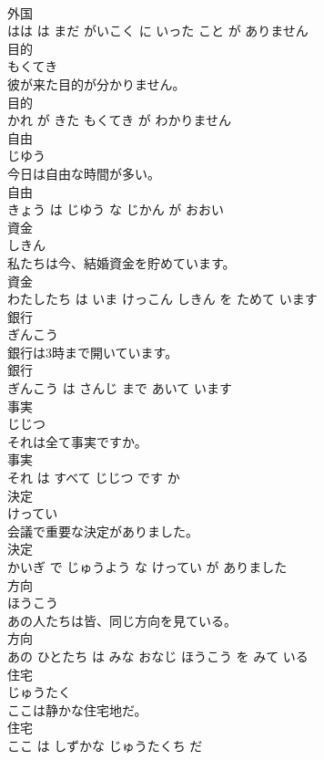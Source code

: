 \documentclass[8pt]{extreport}
\begin{document}
\begin{CJK}{UTF8}{min}
\\	外国 
\\	はは は まだ がいこく に いった こと が ありません			
\\	目的	
\\	もくてき			
\\	彼が来た目的が分かりません。	
\\	目的 
\\	かれ が きた もくてき が わかりません			
\\	自由	
\\	じゆう			
\\	今日は自由な時間が多い。	
\\	自由 
\\	きょう は じゆう な じかん が おおい			
\\	資金	
\\	しきん			
\\	私たちは今、結婚資金を貯めています。	
\\	資金 
\\	わたしたち は いま けっこん しきん を ためて います			
\\	銀行	
\\	ぎんこう			
\\	銀行は3時まで開いています。	
\\	銀行 
\\	ぎんこう は さんじ まで あいて います			
\\	事実	
\\	じじつ			
\\	それは全て事実ですか。	
\\	事実 
\\	それ は すべて じじつ です か			
\\	決定	
\\	けってい			
\\	会議で重要な決定がありました。	
\\	決定 
\\	かいぎ で じゅうよう な けってい が ありました			
\\	方向	
\\	ほうこう			
\\	あの人たちは皆、同じ方向を見ている。	
\\	方向 
\\	あの ひとたち は みな おなじ ほうこう を みて いる			
\\	住宅	
\\	じゅうたく			
\\	ここは静かな住宅地だ。	
\\	住宅 
\\	ここ は しずかな じゅうたくち だ			

\end{CJK}
\end{document}
